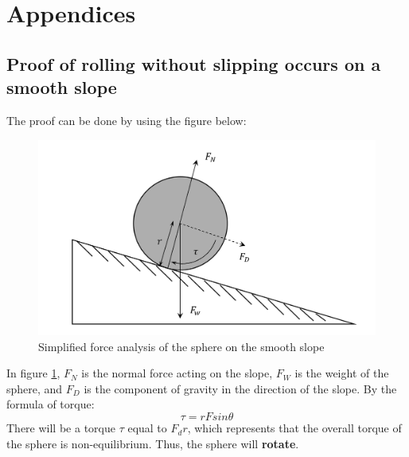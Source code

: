 \documentclass[conference]{IEEEtran}
\begin{document}
\newpage
\appendix
\section{Appendices}
    \subsection{Proof of rolling without slipping occurs on a smooth slope} \label{proofofslide}
The proof can be done by using the figure below:
\begin{figure}[H]
    \centering
    \includegraphics[width=0.5\linewidth]{no_friction.png}
    \caption{Simplified force analysis of the sphere on the smooth slope}
    \label{frictionless}
\end{figure}
In figure \ref{frictionless}, $F_N$ is the normal force acting on the slope, $F_W$ is the weight of the sphere, and $F_D$ is the component of gravity in the direction of the slope.
By the formula of torque:
\begin{equation}
    \tau = rFsin\theta
\end{equation}
There will be a torque $\tau$ equal to $F_dr$, which represents that the overall torque of the sphere is non-equilibrium. Thus, the sphere will \textbf{rotate}.
\end{document}
